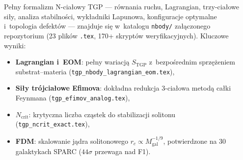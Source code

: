 \begin{remark}\label{rem:nbody-package}
Pe\l{}ny formalizm N-cia\l{}owy TGP --- r\'ownania ruchu,
Lagrangian, trzy-cia\l{}owe si\l{}y, analiza stabilno\'sci,
wyk\l{}adniki Lapunowa, konfiguracje optymalne i~topologia
defekt\'ow --- znajduje si\k{e} w~katalogu \texttt{nbody/}
za\l{}\k{a}czonego repozytorium (23 plik\'ow \texttt{.tex},
170+ skrypt\'ow weryfikacyjnych).
Kluczowe wyniki:
\begin{itemize}[nosep]
  \item \textbf{Lagrangian i~EOM}:
    pe\l{}ny wariacj\k{a} $S_{\mathrm{TGP}}$ z~bezpo\'srednim
    sprz\k{e}\.zeniem substrat--materia
    (\texttt{tgp\_nbody\_lagrangian\_eom.tex}),
  \item \textbf{Si\l{}y tr\'ojcia\l{}owe Efimova}:
    dok\l{}adna redukcja 3-cia\l{}owa metod\k{a} ca\l{}ki
    Feynmana (\texttt{tgp\_efimov\_analog.tex}),
  \item \textbf{$N_{\mathrm{crit}}$}:
    krytyczna liczba cz\k{a}stek do stabilizacji solitonu
    (\texttt{tgp\_ncrit\_exact.tex}),
  \item \textbf{FDM}: skalowanie j\k{a}dra solitonowego
    $r_c \propto M_{\mathrm{gal}}^{-1/9}$,
    potwierdzone na 30 galaktykach SPARC
    ($44\sigma$ przewaga nad F1).
\end{itemize}
\end{remark}

